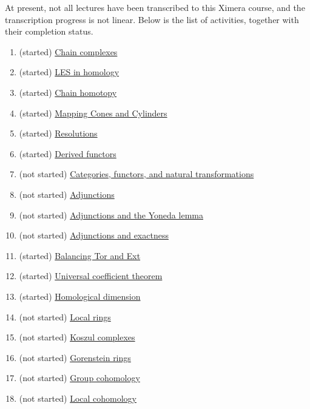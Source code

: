 \documentclass{ximera}
\begin{document}
At present, not all lectures have been transcribed to this Ximera
course, and the transcription progress is not linear.  Below is the
list of activities, together with their completion status.

\begin{enumerate}
\item (started) \href{/activity/chainComplexes/chainComplexes/}{Chain complexes}
\item (started) \href{/activity/lesInHomology/lesInHomology/}{LES in homology}
\item (started) \href{/activity/chainHomotopy/chainHomotopy/}{Chain homotopy}
\item (started) \href{/activity/mappingConesAndCylinders/mappingConesAndCylinders/}{Mapping Cones and Cylinders}
\item (started) \href{/activity/resolutions/resolutions/}{Resolutions}
\item (started) \href{/activity/derivedFunctors/derivedFunctors/}{Derived functors}
\item (not started) \href{/activity/categoriesFunctorsAndNaturalTransformations/categoriesFunctorsAndNaturalTransformations/}{Categories, functors, and natural transformations}
\item (not started) \href{/activity/adjunctions/adjunctions/}{Adjunctions}
\item (not started) \href{/activity/adjunctionsAndTheYonedaLemma/adjunctionsAndTheYonedaLemma/}{Adjunctions and the Yoneda lemma}
\item (not started) \href{/activity/adjunctionsAndExactness/adjunctionsAndExactness/}{Adjunctions and exactness}
\item (started) \href{/activity/balancingTorAndExt/balancingTorAndExt/}{Balancing Tor and Ext}
\item (started) \href{/activity/universalCoefficientTheorem/universalCoefficientTheorem/}{Universal coefficient theorem}
\item (started) \href{/activity/homologicalDimension/homologicalDimension/}{Homological dimension}
\item (not started) \href{/activity/localRings/localRings/}{Local rings}
\item (not started) \href{/activity/koszulComplexes/koszulComplexes/}{Koszul complexes}
\item (not started) \href{/activity/gorensteinRings/gorensteinRings/}{Gorenstein rings}
\item (not started) \href{/activity/groupCohomology/groupCohomology/}{Group cohomology}
\item (not started)
  \href{/activity/localCohomology/localCohomology/}{Local cohomology}
\end{enumerate}
\end{document}
